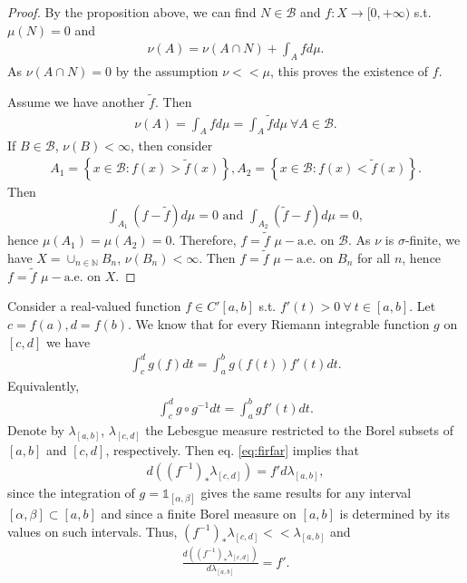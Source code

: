 \ifdetailed
\begin{proof}
    By the proposition above, we can find \(N\in\mathscr{B}\) and \(f:X\rightarrow[0,+\infty)\) s.t. \(\mu(N)=0\) and
    \begin{align*}
        \nu(A)=\nu\left(A\cap N\right) + \int_A fd\mu.
    \end{align*}
    As \(\nu(A\cap N)=0\) by the assumption \(\nu<<\mu\), this proves the existence of \(f\).
    
    Assume we have another \(\tilde{f}\). Then 
    \begin{align*}
        \nu(A)=\int_Afd\mu=\int_A\tilde{f}d\mu \ \forall A\in\mathscr{B}.
    \end{align*}
    If \(B\in\mathscr{B}\), \(\nu(B)<\infty\), then consider 
    \begin{align*}
        A_1 = \left\{x\in\mathscr{B}:f(x)>\tilde{f}(x)\right\}, A_2 = \left\{x\in\mathscr{B}:f(x)<\tilde{f}(x)\right\}. 
    \end{align*}
    Then 
    \begin{align*}
        \int_{A_1}(f-\tilde{f})d\mu = 0 \text{ and } \int_{A_2}(\tilde{f} - f) d\mu = 0,
    \end{align*}
    hence \(\mu(A_1)=\mu(A_2)=0\). Therefore, \(f=\tilde{f}\) \(\mu-\text{a.e.}\) on \(\mathscr{B}\). As \(\nu\) is \(\sigma\)-finite,
    we have \(X=\cup_{n\in\mathbb{N}}B_n\), \(\nu(B_n)<\infty\). Then \(f=\tilde{f}\) \(\mu-\text{a.e.}\) on \(B_n\) for all \(n\),
    hence \(f=\tilde{f}\) \(\mu-\text{a.e.}\) on \(X\).
\end{proof}
\fi
\begin{example}
    Consider a real-valued function \(f\in C'[a,b]\) s.t. \(f'(t)>0 \ \forall \ t\in[a,b]\). Let \(c=f(a), d=f(b)\). We know that for every
    Riemann integrable function \(g\) on \([c,d]\) we have
    \begin{align*}
        \int_{c}^{d}g(f)dt = \int_{a}^{b}g(f(t))f'(t)dt.
    \end{align*}
    Equivalently, 
    \begin{align}  \label{eq:firfar}
        \int_{c}^{d} g\circ g^{-1}dt = \int_{a}^{b}gf'(t)dt.
    \end{align}
    Denote by \(\lambda_{[a,b]}\), \(\lambda_{[c,d]}\) the Lebesgue measure restricted to the Borel subsets of \([a,b]\) and 
    \([c,d]\), respectively. Then eq. \ref{eq:firfar} implies that 
    \begin{align*}
        d\left((f^{-1})_{*}\lambda_{[c,d]}\right) = f'd\lambda_{[a,b]},
    \end{align*}
    since the integration of \(g=\mathds{1}_{[\alpha,\beta]}\) gives the same results for any interval \([\alpha,\beta]\subset[a,b]\)
    and since a finite Borel measure on \([a,b]\) is determined by its values on such intervals. Thus, 
    \((f^{-1})_{*}\lambda_{[c,d]}<<\lambda_{[a,b]}\) and
    \begin{align*}
        \frac{d\left((f^{-1})_{*}\lambda_{[c,d]}\right)}{d\lambda_{[a,b]}} = f'.
    \end{align*}
\end{example}